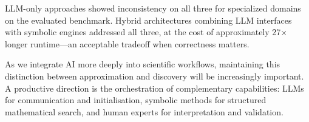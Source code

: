 \documentclass[twoside,11pt]{article}
\begin{document}
LLM-only approaches showed inconsistency on all three for specialized domains on the evaluated benchmark. Hybrid architectures combining LLM interfaces with symbolic engines addressed all three, at the cost of approximately 27$\times$ longer runtime---an acceptable tradeoff when correctness matters.

As we integrate AI more deeply into scientific workflows, maintaining this distinction between approximation and discovery will be increasingly important. A productive direction is the orchestration of complementary capabilities: LLMs for communication and initialisation, symbolic methods for structured mathematical search, and human experts for interpretation and validation.







\end{document}
